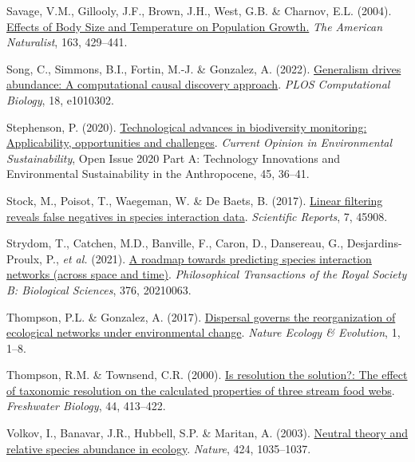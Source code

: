 \documentclass[11pt]{article}
\newlength{\cslhangindent}
\newenvironment{CSLReferences}[3] %
 {%
  \setlength{\parindent}{0pt}
  \ifodd #1 \everypar{\setlength{\hangindent}{\cslhangindent}}\ignorespaces\fi
  \ifnum #2 > 0
  \setlength{\parskip}{#2\baselineskip}
  \fi
 }%
 {}
\begin{document}
\begin{CSLReferences}{1}{0}
\leavevmode{}%
Savage, V.M., Gillooly, J.F., Brown, J.H., West, G.B. \& Charnov, E.L.
(2004). \href{https://doi.org/10.1086/381872}{Effects of Body Size and
Temperature on Population Growth.} \emph{The American Naturalist}, 163,
429--441.

\leavevmode{}%
Song, C., Simmons, B.I., Fortin, M.-J. \& Gonzalez, A. (2022).
\href{https://doi.org/10.1371/journal.pcbi.1010302}{Generalism drives
abundance: A computational causal discovery approach}. \emph{PLOS
Computational Biology}, 18, e1010302.

\leavevmode{}%
Stephenson, P. (2020).
\href{https://doi.org/10.1016/j.cosust.2020.08.005}{Technological
advances in biodiversity monitoring: Applicability, opportunities and
challenges}. \emph{Current Opinion in Environmental Sustainability},
Open Issue 2020 Part A: Technology Innovations and Environmental
Sustainability in the Anthropocene, 45, 36--41.

\leavevmode{}%
Stock, M., Poisot, T., Waegeman, W. \& De Baets, B. (2017).
\href{https://doi.org/10.1038/srep45908}{Linear filtering reveals false
negatives in species interaction data}. \emph{Scientific Reports}, 7,
45908.

\leavevmode{}%
Strydom, T., Catchen, M.D., Banville, F., Caron, D., Dansereau, G.,
Desjardins-Proulx, P., \emph{et al.} (2021).
\href{https://doi.org/10.1098/rstb.2021.0063}{A roadmap towards
predicting species interaction networks (across space and time)}.
\emph{Philosophical Transactions of the Royal Society B: Biological
Sciences}, 376, 20210063.

\leavevmode{}%
Thompson, P.L. \& Gonzalez, A. (2017).
\href{https://doi.org/10.1038/s41559-017-0162}{Dispersal governs the
reorganization of ecological networks under environmental change}.
\emph{Nature Ecology \& Evolution}, 1, 1--8.

\leavevmode{}%
Thompson, R.M. \& Townsend, C.R. (2000).
\href{https://doi.org/10.1046/j.1365-2427.2000.00579.x}{Is resolution
the solution?: The effect of taxonomic resolution on the calculated
properties of three stream food webs}. \emph{Freshwater Biology}, 44,
413--422.

\leavevmode{}%
Volkov, I., Banavar, J.R., Hubbell, S.P. \& Maritan, A. (2003).
\href{https://doi.org/10.1038/nature01883}{Neutral theory and relative
species abundance in ecology}. \emph{Nature}, 424, 1035--1037.


\end{CSLReferences}
\end{document}

